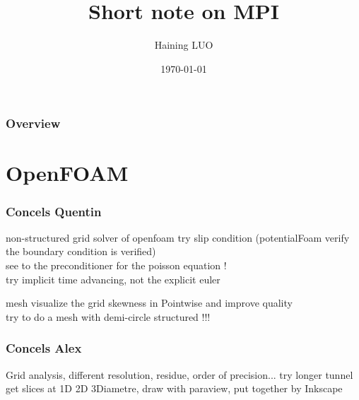 \documentclass{beamer}
\title[Short title]{Short note on MPI} %
\author{Haining LUO} %
\institute[] %
{
ECL \\ %
\medskip
\textit{haining.luo@doctorant.ec-lyon.fr} %
}
\date{\today} %
\begin{document}
\begin{frame}
\titlepage %
\end{frame}

\begin{frame}
\frametitle{Overview} %
\tableofcontents %
\end{frame}

\section{OpenFOAM}

\begin{frame}
\frametitle{Concels Quentin}

\begin{block}{non-structured grid solver of openfoam}
try slip condition (potentialFoam verify the boundary condition is verified) \\
see to the preconditioner for the poisson equation ! \\
try implicit time advancing, not the explicit euler \\
\end{block}

\begin{block}{mesh}
visualize the grid skewness in Pointwise and improve quality \\
try to do a mesh with demi-circle structured !!!\\
\end{block}
\end{frame}


\begin{frame}
\frametitle{Concels Alex}

Grid analysis, different resolution, residue, order of precision...
try longer tunnel get slices at 1D 2D 3Diametre, draw with paraview, put together by Inkscape

\end{frame}
\end{document}
